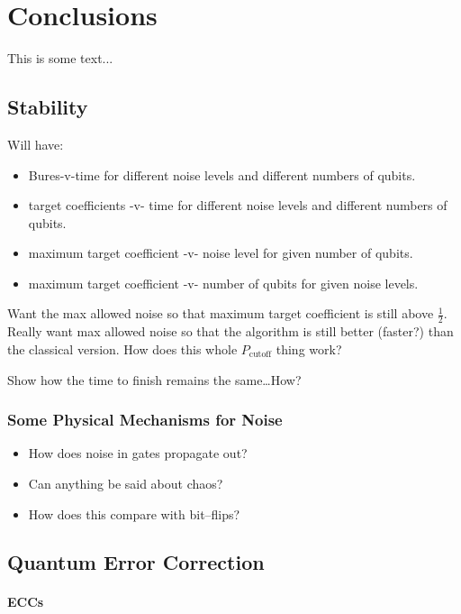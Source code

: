 
\chapter{Conclusions}
\label{chap:conclusion}
%

This is some text...

\section{Stability}

Will have:
\begin{itemize}
\item Bures-v-time for different noise levels and different numbers of qubits.
\item target coefficients -v- time for different noise levels and different numbers
of qubits.
\item maximum target coefficient -v- noise level for given number of qubits.
\item maximum target coefficient -v- number of qubits for given noise levels.
\end{itemize}
Want the max allowed noise so that maximum target coefficient is still above 
$\frac{1}{2}$.  Really want max allowed noise so that the algorithm is still
better (faster?) than the classical version.  How does this whole
$P_{\text{cutoff}}$ thing work?\cite{Pablo-Norman/Ruiz-Altaba:99}

Show how the time to finish remains the same\dots How?


\subsection{Some Physical Mechanisms for Noise}

\begin{itemize}
\item How does noise in gates propagate out?
\item Can anything be said about chaos?
\item How does this compare with bit--flips?
\end{itemize}



\section{Quantum Error Correction}

\subsubsection{ECCs}
